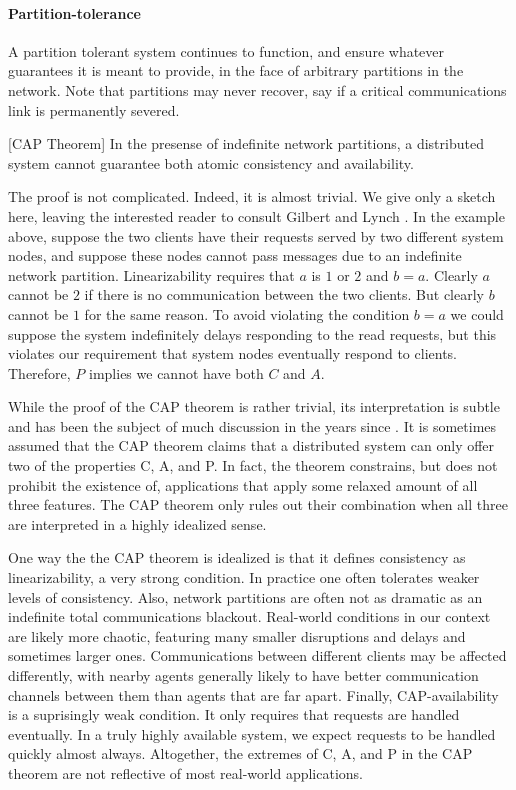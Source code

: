 \begin{itemize}
\paragraph{Partition-tolerance}

A partition tolerant system continues to function, and ensure whatever
guarantees it is meant to provide, in the face of arbitrary partitions
in the network. Note that partitions may never recover, say if a
critical communications link is permanently severed.

\begin{theorem}\label{thm:cap}[CAP Theorem]
In the presense of indefinite network partitions, a distributed system
cannot guarantee both atomic consistency and availability.
\end{theorem}

The proof is not complicated. Indeed, it is almost trivial. We give
only a sketch here, leaving the interested reader to consult Gilbert
and Lynch \cite{2002gilbertlynchCAP}. In the example above, suppose the two clients have
their requests served by two different system nodes, and suppose these
nodes cannot pass messages due to an indefinite network
partition. Linearizability requires that $a$ is $1$ or $2$ and $b =
a$.  Clearly $a$ cannot be $2$ if there is no communication between
the two clients. But clearly $b$ cannot be $1$ for the same reason.
To avoid violating the condition $b = a$ we could suppose the system
indefinitely delays responding to the read requests, but this violates
our requirement that system nodes eventually respond to
clients. Therefore, $P$ implies we cannot have both $C$ and $A$.

While the proof of the CAP theorem is rather trivial, its
interpretation is subtle and has been the subject of much discussion
in the years since \cite{2012CAP12Years}. It is sometimes assumed that
the CAP theorem claims that a distributed system can only offer two of
the properties C, A, and P. In fact, the theorem constrains, but does
not prohibit the existence of, applications that apply some relaxed
amount of all three features. The CAP theorem only rules out their
combination when all three are interpreted in a highly idealized
sense.

One way the the CAP theorem is idealized is that it defines
consistency as linearizability, a very strong condition. In practice
one often tolerates weaker levels of consistency. Also, network
partitions are often not as dramatic as an indefinite total
communications blackout. Real-world conditions in our context are
likely more chaotic, featuring many smaller disruptions and delays and
sometimes larger ones. Communications between different clients may be
affected differently, with nearby agents generally likely to have
better communication channels between them than agents that are far
apart. Finally, CAP-availability is a suprisingly weak condition. It
only requires that requests are handled eventually. In a truly highly
available system, we expect requests to be handled quickly almost
always. Altogether, the extremes of C, A, and P in the CAP theorem are
not reflective of most real-world applications.


\end{itemize}
